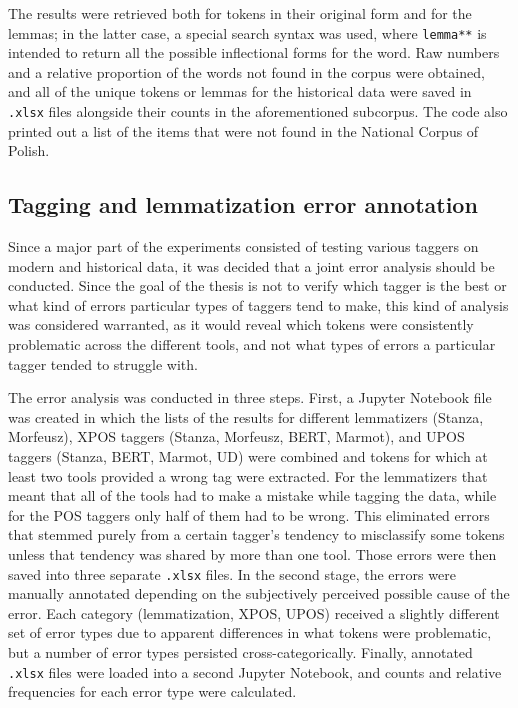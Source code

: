 The results were retrieved both for tokens in their original form and for the lemmas; in the latter case, a special search syntax was used, where \texttt{lemma**} is intended to return all the possible inflectional forms for the word. Raw numbers and a relative proportion of the words not found in the corpus were obtained, and all of the unique tokens or lemmas for the historical data were saved in \texttt{.xlsx} files alongside their counts in the aforementioned subcorpus. The code also printed out a list of the items that were not found in the National Corpus of Polish. 

\subsection{Tagging and lemmatization error annotation}
\label{subsec:error-annotation}

Since a major part of the experiments consisted of testing various taggers on modern and historical data, it was decided that a joint error analysis should be conducted. Since the goal of the thesis is not to verify which tagger is the best or what kind of errors particular types of taggers tend to make, this kind of analysis was considered warranted, as it would reveal which tokens were consistently problematic across the different tools, and not what types of errors a particular tagger tended to struggle with.

The error analysis was conducted in three steps. First, a Jupyter Notebook file was created in which the lists of the results for different lemmatizers (Stanza, Morfeusz), XPOS taggers (Stanza, Morfeusz, BERT, Marmot), and UPOS taggers (Stanza, BERT, Marmot, UD) were combined and tokens for which at least two tools provided a wrong tag were extracted. For the lemmatizers that meant that all of the tools had to make a mistake while tagging the data, while for the POS taggers only half of them had to be wrong. This eliminated errors that stemmed purely from a certain tagger's tendency to misclassify some tokens unless that tendency was shared by more than one tool. Those errors were then saved into three separate \texttt{.xlsx} files. In the second stage, the errors were manually annotated depending on the subjectively perceived possible cause of the error. Each category (lemmatization, XPOS, UPOS) received a slightly different set of error types due to apparent differences in what tokens were problematic, but a number of error types persisted cross-categorically. Finally, annotated \texttt{.xlsx} files were loaded into a second Jupyter Notebook, and counts and relative frequencies for each error type were calculated. 
